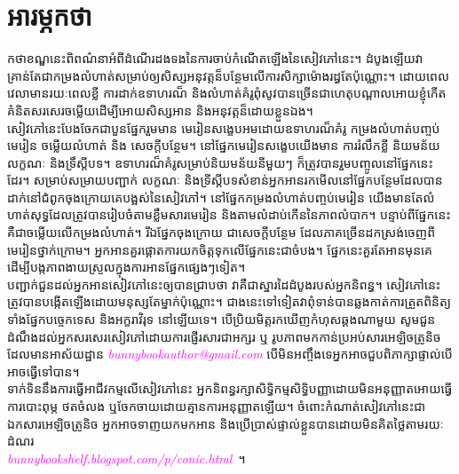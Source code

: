 \chapter*{អារម្ភកថា}
កថាខណ្ឌនេះពិពណ៌នាអំពីដំណើរដងទងនៃការចាប់កំណើតឡើងនៃសៀវភៅនេះ។ ដំបូងឡើយវាគ្រាន់តែជាកម្រងលំហាត់សម្រាប់ឲ្យសិស្សអនុវត្តន៏បន្ថែមលើការសិក្សាម៉ោងរដ្ធតែប៉ុណ្ណោះ។ ដោយពេលវេលាមានរយៈពេលខ្លី ការដាក់ឧទាហរណ៏ និងលំហាត់គំរូពុំសូវបានច្រើនជាហេតុបណ្ដាលអោយខ្ញុំកើតគំនិតសរសេរចម្លើយដើម្បីអោយសិស្សអាន និងអនុវត្តន៏ដោយខ្លួនឯង។
\\[1em]
សៀវភៅនេះបែងចែកជាបួនផ្នែករួមមាន មេរៀនសង្ខេបអមដោយឧទាហរណ៏គំរូ កម្រងលំហាត់បញ្ចប់មេរៀន ចម្លើយលំហាត់ និង សេចក្ដីបន្ថែម។ នៅផ្នែកមេរៀនសង្ខេបយើងមាន ការរំលឹកខ្លី និយមន័យ លក្ខណៈ និងទ្រឹស្ដីបទ។ ឧទាហរណ៏គំរូសម្រាប់និយមន័យនីមួយៗ ក៏ត្រូវបានរួមបញ្ចូលនៅផ្នែកនេះដែរ។ សម្រាប់សម្រាយបញ្ជាក់ លក្ខណៈ និងទ្រីស្ដីបទសំខាន់អ្នកអានរកមើលនៅផ្នែកបន្ថែមដែលបានដាក់នៅជំពូកចុងក្រោយគេបង្អស់នៃសៀវភៅ។ នៅផ្នែកកម្រងលំហាត់បញ្ចប់មេរៀន យើងមានតែលំហាត់សុទ្ធដែលត្រូវបានរៀបចំតាមខ្លឹមសារមេរៀន និងតាមលំដាប់កើននៃភាពលំបាក។ បន្ទាប់ពីផ្នែកនេះគឺជាចម្លើយលើកម្រងលំហាត់។ រីឯផ្នែកចុងក្រោយ ជាសេចក្ដីបន្ថែម ដែលភាគច្រើនដកស្រង់ចេញពីមេរៀនថ្នាក់ក្រោម។ អ្នកអានគួរផ្ដោតការយកចិត្តទុកលើផ្នែកនេះជាចំបង។ ផ្នែកនេះគួរតែអានមុនគេដើម្បីបង្កភាពងាយស្រួលក្នុងការអានផ្នែកផ្សេងៗទៀត។
\\[1em]
បញ្ជាក់ជួនដល់អ្នកអានសៀវភៅនេះឲ្យបានជ្រាបថា វាគឺជាស្នារដៃដំបូងរបស់អ្នកនិពន្ធ។ សៀវភៅនេះត្រូវបានបង្កើតឡើងដោយមនុស្សតែម្នាក់ប៉ុណ្ណោះ។ ជាងនេះទៅទៀតវាពុំទាន់បានឆ្លងកាត់ការត្រួតពិនិត្យទាំងផ្នែកបច្ចេកទេស និងអក្ខរាវិរុទ នៅឡើយទេ។ បើប្រិយមិត្តរកឃើញកំហុសឆ្គងណាមួយ សូមជួនដំណឹងដល់អ្នកសរសេរសៀវភៅដោយការផ្ញើរសារជាអក្សរ ឬ រូបភាពមកកាន់ប្រអប់សារអេឡិចត្រូនិច ដែលមានអាស័យដ្ឋាន \textcolor{magenta}{\itshape bunnybookauthor@gmail.com} បើមិនអញ្ចឹងទេអ្នកអាចជួបពិភាក្សាផ្ទាល់បើអាចធ្វើទៅបាន។
\\[1em]
ទាក់ទិននឹងការធ្វើអាជីវកម្មលើសៀវភៅនេះ អ្នកនិពន្ធរក្សាសិទ្ធិកម្មសិទ្ធិបញ្ញាដោយមិនអនុញ្ញាតអោយធ្វើការបោះពុម្ភ ថតចំលង ឬចែកចាយដោយគ្មានការអនុញ្ញាតឡើយ។ ចំពោះកំណាត់សៀវភៅនេះជាឯកសារអេឡិចត្រូនិច អ្នកអាចទាញយកមកអាន និងប្រើប្រាស់ផ្ទាល់ខ្លួនបានដោយមិនគិតថ្លៃតាមរយៈដំណរ\\ \textcolor{magenta}{\itshape bunnybookshelf.blogspot.com/p/conic.html}~។